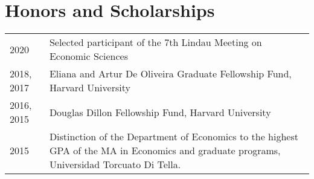 \documentclass[letterpaper,9pt]{article} %
\begin{document}
\section{Honors and Scholarships}
\begin{tabular}{>{\raggedleft\arraybackslash}p{}|p{}}
	\textsc{2020} & Selected participant of the 7th Lindau Meeting on Economic Sciences \\
	
	\textsc{2018, 2017} & Eliana and Artur De Oliveira Graduate Fellowship Fund, Harvard University \\
	
	\textsc{2016, 2015} & Douglas Dillon Fellowship Fund, Harvard University \\
	
	\textsc{2015} & Distinction of the Department of Economics to the highest GPA of the MA in Economics and graduate programs, Universidad Torcuato Di Tella. \\
	
\end{tabular}
\end{document}

